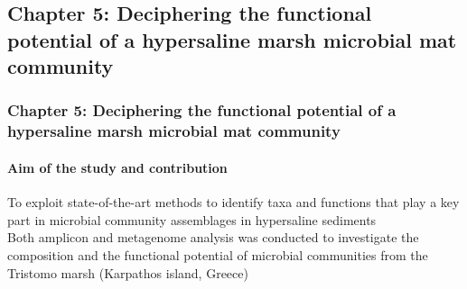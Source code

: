 \documentclass{beamer}
\begin{document}
   \begin{darkframes}
      \section{
         \textbf{Chapter 5:} Deciphering the functional potential of a hypersaline marsh microbial mat community
      }

      \begin{frame}
         \frametitle{\textbf{Chapter 5:} Deciphering the functional potential of a hypersaline marsh microbial mat community}
         \framesubtitle{Aim of the study and contribution}

         To exploit state-of-the-art methods to identify taxa and functions that play a key
         part in microbial community assemblages in hypersaline sediments \\ \bigskip 
         Both amplicon and metagenome analysis was conducted to investigate the composition and the functional 
         potential of microbial communities from the Tristomo marsh (Karpathos island, Greece)
      \end{frame}

   \end{darkframes}
\end{document}
